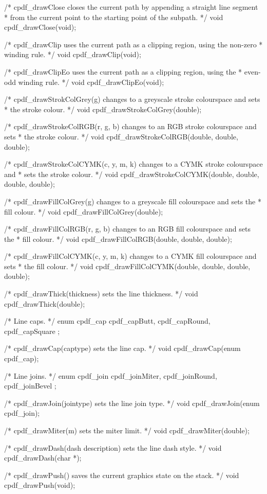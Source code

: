 /* cpdf_drawClose closes the current path by appending a straight line segment
 * from the current point to the starting point of the subpath. */
void cpdf_drawClose(void);

/* cpdf_drawClip uses the current path as a clipping region, using the non-zero
 * winding rule. */
void cpdf_drawClip(void);

/* cpdf_drawClipEo uses the current path as a clipping region, using the
 * even-odd winding rule. */
void cpdf_drawClipEo(void);

/* cpdf_drawStrokColGrey(g) changes to a greyscale stroke colourspace and sets
 * the stroke colour. */
void cpdf_drawStrokeColGrey(double);

/* cpdf_drawStrokeColRGB(r, g, b) changes to an RGB stroke colourspace and sets
 * the stroke colour. */
void cpdf_drawStrokeColRGB(double, double, double);

/* cpdf_drawStrokeColCYMK(c, y, m, k) changes to a CYMK stroke colourspace and
 * sets the stroke colour. */
void cpdf_drawStrokeColCYMK(double, double, double, double);

/* cpdf_drawFillColGrey(g) changes to a greyscale fill colourspace and sets the
 * fill colour. */
void cpdf_drawFillColGrey(double);

/* cpdf_drawFillColRGB(r, g, b) changes to an RGB fill colourspace and sets the
 * fill colour. */
void cpdf_drawFillColRGB(double, double, double);

/* cpdf_drawFillColCYMK(c, y, m, k) changes to a CYMK fill colourspace and sets
 * the fill colour. */
void cpdf_drawFillColCYMK(double, double, double, double);

/* cpdf_drawThick(thickness) sets the line thickness. */
void cpdf_drawThick(double);

/* Line caps. */
enum cpdf_cap { cpdf_capButt, cpdf_capRound, cpdf_capSquare };

/* cpdf_drawCap(captype) sets the line cap. */
void cpdf_drawCap(enum cpdf_cap);

/* Line joins. */
enum cpdf_join { cpdf_joinMiter, cpdf_joinRound, cpdf_joinBevel };

/* cpdf_drawJoin(jointype) sets the line join type. */
void cpdf_drawJoin(enum cpdf_join);

/* cpdf_drawMiter(m) sets the miter limit. */
void cpdf_drawMiter(double);

/* cpdf_drawDash(dash description) sets the line dash style. */
void cpdf_drawDash(char *);

/* cpdf_drawPush() saves the current graphics state on the stack. */
void cpdf_drawPush(void);

